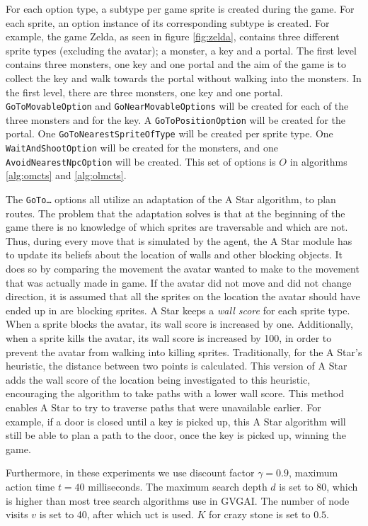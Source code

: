 For each option type, a subtype per game sprite is created during the game. For
each sprite, an option instance of its corresponding subtype is created. For
example, the game Zelda, as seen in figure \ref{fig:zelda}, contains three
different sprite types (excluding the avatar); a monster, a key and a portal.
The first level contains three monsters, one key and one portal and the aim of
the game is to collect the key and walk towards the portal without walking into
the monsters. In the first level, there are three monsters, one key and one
portal. \texttt{GoToMovableOption} and \texttt{GoNearMovableOptions} will be
created for each of the three monsters and for the key. A
\texttt{GoToPositionOption} will be created for the portal.  One
\texttt{GoToNearestSpriteOfType} will be created per sprite type. One
\texttt{WaitAndShootOption} will be created for the monsters, and one
\texttt{AvoidNearestNpcOption} will be created. This set of options is $O$ in
algorithms \ref{alg:omcts} and \ref{alg:olmcts}.

The \texttt{GoTo\ldots} options all utilize an adaptation of the A Star
algorithm, to plan routes. The problem that the adaptation solves is that at the
beginning of the game there is no knowledge of which sprites are traversable and
which are not. Thus, during every move that is simulated by the agent, the A
Star module has to update its beliefs about the location of walls and other
blocking objects. It does so by comparing the movement the avatar wanted to make
to the movement that was actually made in game. If the avatar did not move and
did not change direction, it is assumed that all the sprites on the location the
avatar should have ended up in are blocking sprites. A Star keeps a \emph{wall
score} for each sprite type. When a sprite blocks the avatar, its wall score is
increased by one. Additionally, when a sprite kills the avatar, its wall score
is increased by 100, in order to prevent the avatar from walking into killing
sprites. Traditionally, for the A Star's heuristic, the distance between two
points is calculated. This version of A Star adds the wall score of the location
being investigated to this heuristic, encouraging the algorithm to take paths
with a lower wall score. This method enables A Star to try to traverse paths
that were unavailable earlier. For example, if a door is closed until a key is
picked up, this A Star algorithm will still be able to plan a path to the door,
once the key is picked up, winning the game.

Furthermore, in these experiments we use discount factor $\gamma = 0.9$,
maximum action time $t = 40$ milliseconds. The maximum search depth $d$
is set to 80, which is higher than most tree search algorithms use in GVGAI. The
number of node visits $v$ is set to 40, after which \textsf{uct} is used. $K$
for crazy stone is set to $0.5$.

